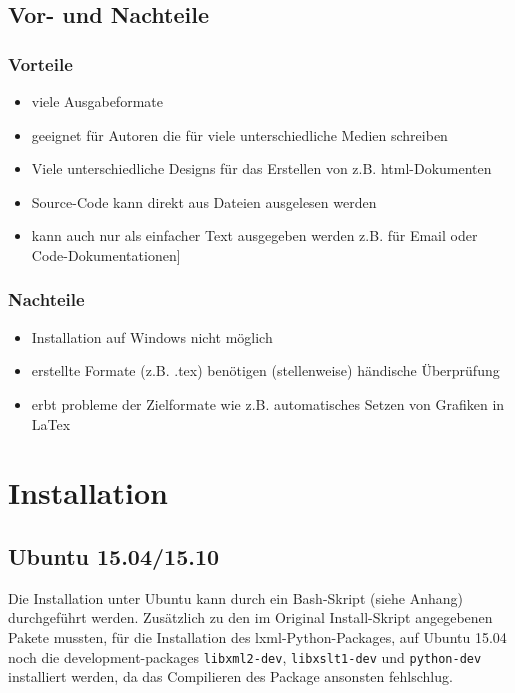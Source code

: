 \documentclass[%
oneside,                 %
final,                   %
chapterprefix=true,      %
open=right,              %
10pt]{book}
\begin{document}
\section{Vor- und Nachteile}
\subsection{Vorteile}
\begin{itemize}
\item viele Ausgabeformate

\item geeignet für Autoren die für viele unterschiedliche Medien schreiben

\item Viele unterschiedliche Designs für das Erstellen von z.B. html-Dokumenten

\item Source-Code kann direkt aus Dateien ausgelesen werden

\item kann auch nur als einfacher Text ausgegeben werden z.B. für Email oder Code-Dokumentationen]
\end{itemize}

\noindent
\subsection{Nachteile}
\begin{itemize}
 \item Installation auf Windows nicht möglich

 \item erstellte Formate (z.B. .tex) benötigen (stellenweise) händische Überprüfung

 \item erbt probleme der Zielformate wie z.B. automatisches Setzen von Grafiken in LaTex
\end{itemize}

\noindent
\chapter{Installation}
\section{Ubuntu 15.04/15.10}
Die Installation unter Ubuntu kann durch ein Bash-Skript (siehe Anhang) durchgeführt werden. Zusätzlich zu den im Original Install-Skript angegebenen Pakete mussten, für die Installation des lxml-Python-Packages, auf Ubuntu 15.04 noch die development-packages  \texttt{libxml2-dev}, \texttt{libxslt1-dev} und \texttt{python-dev} installiert werden, da das Compilieren des Package ansonsten fehlschlug.
\end{document}

